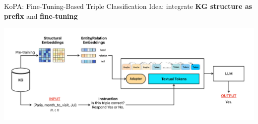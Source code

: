 \documentclass[aspectratio=169,xcolor=dvipsnames]{beamer}
\begin{document}

\begin{frame}{KoPA: Fine-Tuning-Based Triple Classification}
    Idea: integrate \textbf{KG structure as prefix} and \textbf{fine-tuning}
    \begin{center}
        \centering
        \includegraphics[width=1\linewidth]{images/KoPA}
    \end{center}
\end{frame}


\end{document}

